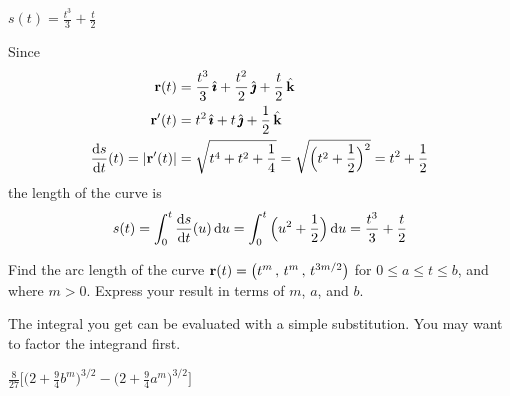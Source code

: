 
\begin{answer} 
$s(t)=\frac{t^3}{3} +\frac{t}{2}$
\end{answer}

\begin{solution} 
Since
\begin{align*}
\vr(t)&= \frac{t^3}{3}\,\hi + \frac{t^2}{2}\,\hj +  \frac{t}{2}\,\hk\\
\vr'(t)&= t^2\,\hi + t\,\hj + \frac{1}{2}\,\hk \\
\diff{s}{t}(t)=|\vr'(t)|&=\sqrt{t^4+t^2+\frac{1}{4}}
=\sqrt{\Big(t^2+\frac{1}{2}\Big)^2}=t^2+\frac{1}{2}
\end{align*}
the length of the curve is
\begin{align*}
s(t)=\int_0^t \diff{s}{t}(u)\,\dee{u}
=\int_0^t \Big(u^2+\frac{1}{2}\Big)\,\dee{u}
=\frac{t^3}{3} +\frac{t}{2}
\end{align*}
\end{solution}


\begin{question}[M317 2011A] %
Find the arc length of the curve 
$\mathbf{r}(t) = \big(t^m\,,\, t^m\,,\, t^{3m/2}\big)$ for $0 \le a \le t \le b$, 
and where $m > 0$.
Express your result in terms of $m$, $a$, and $b$. 
\end{question}

\begin{hint} 
The integral you get can be evaluated with
a simple substitution. You may want to factor the integrand first.
\end{hint}

\begin{answer} 
$\frac{8}{27}\Big[\Big(2 + \frac{9}{4}b^m\Big)^{3/2}
                   -\Big(2 + \frac{9}{4}a^m\Big)^{3/2}\Big]$
\end{answer}

